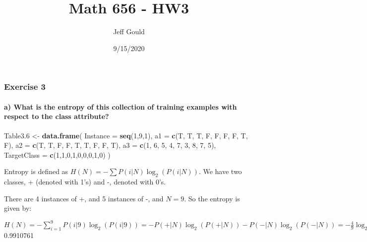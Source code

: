 \documentclass[]{article}
\title{Math 656 - HW3}
\author{Jeff Gould}
\date{9/15/2020}
\newenvironment{Shaded}{\begin{snugshade}}{\end{snugshade}}
\newcommand{\DataTypeTok}[1]{\textcolor[rgb]{0.13,0.29,0.53}{#1}}
\newcommand{\DecValTok}[1]{\textcolor[rgb]{0.00,0.00,0.81}{#1}}
\newcommand{\FloatTok}[1]{\textcolor[rgb]{0.00,0.00,0.81}{#1}}
\newcommand{\KeywordTok}[1]{\textcolor[rgb]{0.13,0.29,0.53}{\textbf{#1}}}
\newcommand{\NormalTok}[1]{#1}
\newcommand{\StringTok}[1]{\textcolor[rgb]{0.31,0.60,0.02}{#1}}
\let\oldparagraph\paragraph
\renewcommand{\paragraph}[1]{\oldparagraph{#1}\mbox{}}
\begin{document}
\maketitle

\hypertarget{exercise-3}{%
\subsubsection{Exercise 3}\label{exercise-3}}

\hypertarget{a-what-is-the-entropy-of-this-collection-of-training-examples-with-respect-to-the-class-attribute}{%
\paragraph{a) What is the entropy of this collection of training
examples with respect to the class
attribute?}\label{a-what-is-the-entropy-of-this-collection-of-training-examples-with-respect-to-the-class-attribute}}

\begin{Shaded}
\begin{Highlighting}[]
\NormalTok{Table3}\FloatTok{.6}\NormalTok{ <-}\StringTok{ }\KeywordTok{data.frame}\NormalTok{(}
  \DataTypeTok{Instance =} \KeywordTok{seq}\NormalTok{(}\DecValTok{1}\NormalTok{,}\DecValTok{9}\NormalTok{,}\DecValTok{1}\NormalTok{),}
  \DataTypeTok{a1 =} \KeywordTok{c}\NormalTok{(T, T, T, F, F, F, F, T, F),}
  \DataTypeTok{a2 =} \KeywordTok{c}\NormalTok{(T, T, F, F, T, T, F, F, T),}
  \DataTypeTok{a3 =} \KeywordTok{c}\NormalTok{(}\DecValTok{1}\NormalTok{, }\DecValTok{6}\NormalTok{, }\DecValTok{5}\NormalTok{, }\DecValTok{4}\NormalTok{, }\DecValTok{7}\NormalTok{, }\DecValTok{3}\NormalTok{, }\DecValTok{8}\NormalTok{, }\DecValTok{7}\NormalTok{, }\DecValTok{5}\NormalTok{),}
  \DataTypeTok{TargetClass =} \KeywordTok{c}\NormalTok{(}\DecValTok{1}\NormalTok{,}\DecValTok{1}\NormalTok{,}\DecValTok{0}\NormalTok{,}\DecValTok{1}\NormalTok{,}\DecValTok{0}\NormalTok{,}\DecValTok{0}\NormalTok{,}\DecValTok{0}\NormalTok{,}\DecValTok{1}\NormalTok{,}\DecValTok{0}\NormalTok{)}
\NormalTok{)}
\end{Highlighting}
\end{Shaded}

Entropy is defined as \(H(N) = -\sum P(i|N)\log_2(P(i|N))\). We have two
classes, + (denoted with 1's) and -, denoted with 0's.

There are 4 instances of +, and 5 instances of -, and \(N=9\). So the
entropy is given by:

\(H(N) = -\sum_{i=1}^9 P(i|9)\log_2 (P(i|9)) = -P(+|N)\log_2(P(+|N))-P(-|N)\log_2(P(-|N)) = -\frac{4}{9}\log_2(\frac{4}{9})-\frac{5}{9}\log_2(\frac{5}{9}) =\)
0.9910761
\end{document}
